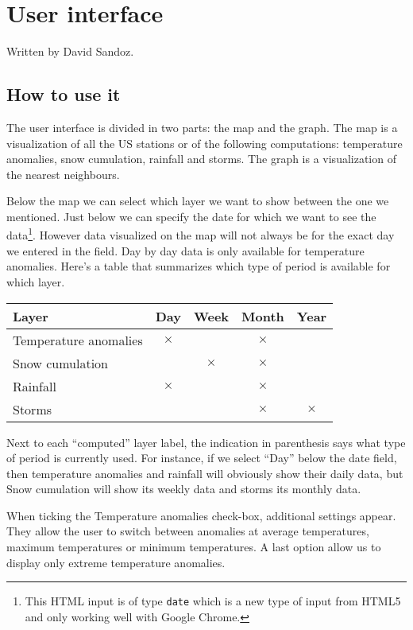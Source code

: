 \section{User interface}
Written by David Sandoz.
\subsection{How to use it}
The user interface is divided in two parts: the map and the graph. The map is a visualization of all the US stations or of the following computations: temperature anomalies, snow cumulation, rainfall and storms. The graph is a visualization of the nearest neighbours.

Below the map we can select which layer we want to show between the one we mentioned. Just below we can specify the date for which we want to see the data\footnote{This HTML input is of type \texttt{date} which is a new type of input from HTML5 and only working well with Google Chrome.}. However data visualized on the map will not always be for the exact day we entered in the field. Day by day data is only available for temperature anomalies. Here's a table that summarizes which type of period is available for which layer.
\begin{center}
\begin{tabular}{|l|c|c|c|c|}\hline \textbf{Layer} & \textbf{Day} & \textbf{Week} & \textbf{Month} & \textbf{Year} \\\hline Temperature anomalies & $\times$ &  & $\times$ &  \\\hline Snow cumulation &  & $\times$ & $\times$ &  \\\hline Rainfall & $\times$ &  & $\times$ &  \\\hline Storms &  &  & $\times$ & $\times$ \\\hline \end{tabular}
\end{center}

Next to each “computed” layer label, the indication in parenthesis says what type of period is currently used. For instance, if we select “Day” below the date field, then temperature anomalies and rainfall will obviously show their daily data, but Snow cumulation will show its weekly data and storms its monthly data.

When ticking the Temperature anomalies check-box, additional settings appear. They allow the user to switch between anomalies at average temperatures, maximum temperatures or minimum temperatures. A last option allow us to display only extreme temperature anomalies.

